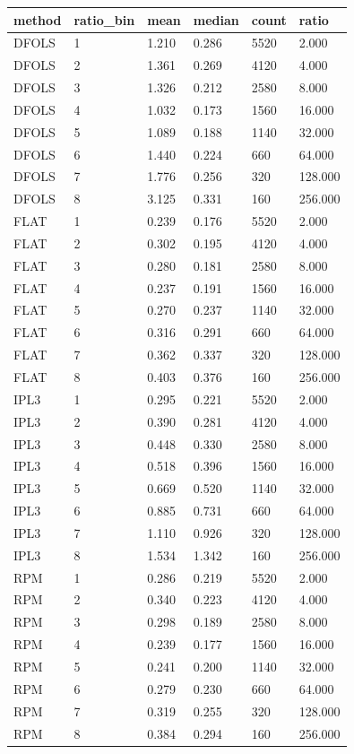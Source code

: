 \begin{tabular}{llllll}
\hline
method & ratio\_bin & mean & median & count & ratio \\
\hline
DFOLS & 1 & 1.210 & 0.286 & 5520 & 2.000 \\
DFOLS & 2 & 1.361 & 0.269 & 4120 & 4.000 \\
DFOLS & 3 & 1.326 & 0.212 & 2580 & 8.000 \\
DFOLS & 4 & 1.032 & 0.173 & 1560 & 16.000 \\
DFOLS & 5 & 1.089 & 0.188 & 1140 & 32.000 \\
DFOLS & 6 & 1.440 & 0.224 & 660 & 64.000 \\
DFOLS & 7 & 1.776 & 0.256 & 320 & 128.000 \\
DFOLS & 8 & 3.125 & 0.331 & 160 & 256.000 \\
FLAT & 1 & 0.239 & 0.176 & 5520 & 2.000 \\
FLAT & 2 & 0.302 & 0.195 & 4120 & 4.000 \\
FLAT & 3 & 0.280 & 0.181 & 2580 & 8.000 \\
FLAT & 4 & 0.237 & 0.191 & 1560 & 16.000 \\
FLAT & 5 & 0.270 & 0.237 & 1140 & 32.000 \\
FLAT & 6 & 0.316 & 0.291 & 660 & 64.000 \\
FLAT & 7 & 0.362 & 0.337 & 320 & 128.000 \\
FLAT & 8 & 0.403 & 0.376 & 160 & 256.000 \\
IPL3 & 1 & 0.295 & 0.221 & 5520 & 2.000 \\
IPL3 & 2 & 0.390 & 0.281 & 4120 & 4.000 \\
IPL3 & 3 & 0.448 & 0.330 & 2580 & 8.000 \\
IPL3 & 4 & 0.518 & 0.396 & 1560 & 16.000 \\
IPL3 & 5 & 0.669 & 0.520 & 1140 & 32.000 \\
IPL3 & 6 & 0.885 & 0.731 & 660 & 64.000 \\
IPL3 & 7 & 1.110 & 0.926 & 320 & 128.000 \\
IPL3 & 8 & 1.534 & 1.342 & 160 & 256.000 \\
RPM & 1 & 0.286 & 0.219 & 5520 & 2.000 \\
RPM & 2 & 0.340 & 0.223 & 4120 & 4.000 \\
RPM & 3 & 0.298 & 0.189 & 2580 & 8.000 \\
RPM & 4 & 0.239 & 0.177 & 1560 & 16.000 \\
RPM & 5 & 0.241 & 0.200 & 1140 & 32.000 \\
RPM & 6 & 0.279 & 0.230 & 660 & 64.000 \\
RPM & 7 & 0.319 & 0.255 & 320 & 128.000 \\
RPM & 8 & 0.384 & 0.294 & 160 & 256.000 \\
\hline
\end{tabular}
